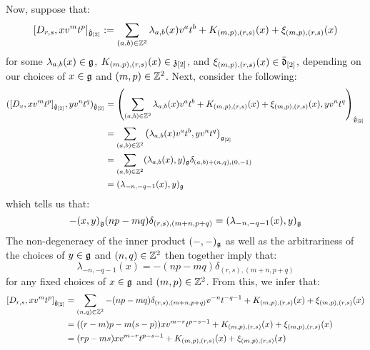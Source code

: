 \begin{remark}
\begin{enumerate}
                    Now, suppose that:
                        $$[D_{r, s}, x v^m t^p]_{\hat{\mathfrak{g}}_{[2]}} := \sum_{(a, b) \in \mathbb{Z}^2} \lambda_{a, b}(x) v^a t^b + K_{(m, p), (r, s)}(x) + \xi_{(m, p), (r, s)}(x)$$
                    for some $\lambda_{a, b}(x) \in \mathfrak{g}$, $K_{(m, p), (r, s)}(x) \in \mathfrak{z}_{[2]}$, and $\xi_{(m, p), (r, s)}(x) \in \bar{\mathfrak{d}}_{[2]}$, depending on our choices of $x \in \mathfrak{g}$ and $(m, p) \in \mathbb{Z}^2$. Next, consider the following:
                        $$
                            \begin{aligned}
                                ( [D_v, x v^m t^p]_{\hat{\mathfrak{g}}_{[2]}}, y v^n t^q )_{\hat{\mathfrak{g}}_{[2]}} & = \left( \sum_{(a, b) \in \mathbb{Z}^2} \lambda_{a, b}(x) v^a t^b + K_{(m, p), (r, s)}(x) + \xi_{(m, p), (r, s)}(x), y v^n t^q \right)_{\hat{\mathfrak{g}}_{[2]}}
                                \\
                                & = \sum_{(a, b) \in \mathbb{Z}^2} \left( \lambda_{a, b}(x) v^a t^b, y v^n t^q \right)_{\mathfrak{g}_{[2]}}
                                \\
                                & = \sum_{(a, b) \in \mathbb{Z}^2} (\lambda_{a, b}(x), y)_{\mathfrak{g}} \delta_{ (a, b) + (n, q), (0, -1) }
                                \\
                                & = (\lambda_{-n, -q - 1}(x), y)_{\mathfrak{g}}
                            \end{aligned}
                        $$
                    which tells us that:
                        $$-(x, y)_{\mathfrak{g}} (np - mq) \delta_{(r, s), (m + n, p + q)} = (\lambda_{-n, -q - 1}(x), y)_{\mathfrak{g}}$$
                    The non-degeneracy of the inner product $(-, -)_{\mathfrak{g}}$ as well as the arbitrariness of the choices of $y \in \mathfrak{g}$ and $(n, q) \in \mathbb{Z}^2$ then together imply that:
                        $$\lambda_{-n, -q - 1}(x) = -(np - mq) \delta_{(r, s), (m + n, p + q)}$$
                    for any fixed choices of $x \in \mathfrak{g}$ and $(m, p) \in \mathbb{Z}^2$. From this, we infer that:
                        $$
                            \begin{aligned}
                                [D_{r, s}, x v^m t^p]_{\hat{\g}_{[2]}} & = \sum_{(n, q) \in \Z^2} -(np - mq) \delta_{(r, s), (m + n, p + q)} v^{-n} t^{-q - 1} + K_{(m, p), (r, s)}(x) + \xi_{(m, p), (r, s)}(x)
                                \\
                                & = ( (r - m)p - m(s - p) ) x v^{m - r} t^{p - s - 1} + K_{(m, p), (r, s)}(x) + \xi_{(m, p), (r, s)}(x)
                                \\
                                & = ( rp - ms ) x v^{m - r} t^{p - s - 1} + K_{(m, p), (r, s)}(x) + \xi_{(m, p), (r, s)}(x)
                            \end{aligned}
                        $$
                        

\end{enumerate}
\end{remark}
